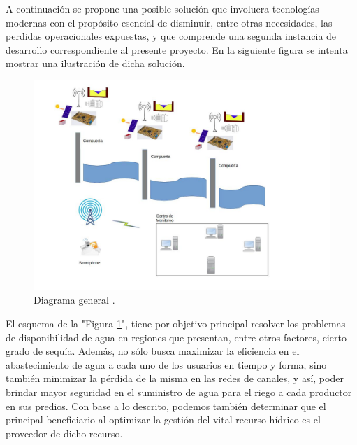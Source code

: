

A continuación se propone una posible solución que involucra tecnologías modernas con el propósito esencial de disminuir, entre otras necesidades, las perdidas operacionales expuestas, y que comprende una segunda instancia de desarrollo correspondiente al presente proyecto. En la siguiente figura se intenta mostrar una ilustración de dicha solución.

\begin{figure}[h]
\centering
\includegraphics[scale=.60]{./Figures/DiagramaEnBloqueGeneralV1.jpg}
\caption{Diagrama general .}
\label{fig:canal}
\end{figure}




El esquema de la "Figura \ref{fig:canal}", tiene por objetivo principal resolver los problemas de disponibilidad de agua en regiones que presentan, entre otros factores, cierto grado de sequía. Además, no sólo busca maximizar la eficiencia en el abastecimiento de agua a cada uno de los usuarios en tiempo y forma, sino también minimizar la pérdida de la misma en las redes de canales, y así, poder brindar mayor seguridad en el suministro de agua para el riego a cada productor en sus predios.
Con base a lo descrito, podemos también determinar que el principal beneficiario al optimizar la gestión del vital recurso hídrico es el proveedor de dicho recurso.

